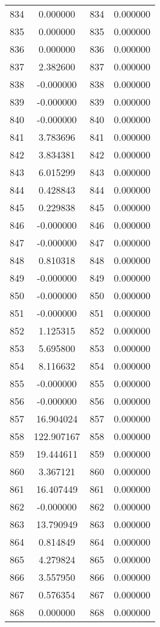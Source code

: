 \documentclass[12pt]{article}
\begin{document}
\begin{longtable}{@{}cccc@{}}
834 & 0.000000 & 834 & 0.000000 \\
835 & 0.000000 & 835 & 0.000000 \\
836 & 0.000000 & 836 & 0.000000 \\
837 & 2.382600 & 837 & 0.000000 \\
838 & -0.000000 & 838 & 0.000000 \\
839 & -0.000000 & 839 & 0.000000 \\
840 & -0.000000 & 840 & 0.000000 \\
841 & 3.783696 & 841 & 0.000000 \\
842 & 3.834381 & 842 & 0.000000 \\
843 & 6.015299 & 843 & 0.000000 \\
844 & 0.428843 & 844 & 0.000000 \\
845 & 0.229838 & 845 & 0.000000 \\
846 & -0.000000 & 846 & 0.000000 \\
847 & -0.000000 & 847 & 0.000000 \\
848 & 0.810318 & 848 & 0.000000 \\
849 & -0.000000 & 849 & 0.000000 \\
850 & -0.000000 & 850 & 0.000000 \\
851 & -0.000000 & 851 & 0.000000 \\
852 & 1.125315 & 852 & 0.000000 \\
853 & 5.695800 & 853 & 0.000000 \\
854 & 8.116632 & 854 & 0.000000 \\
855 & -0.000000 & 855 & 0.000000 \\
856 & -0.000000 & 856 & 0.000000 \\
857 & 16.904024 & 857 & 0.000000 \\
858 & 122.907167 & 858 & 0.000000 \\
859 & 19.444611 & 859 & 0.000000 \\
860 & 3.367121 & 860 & 0.000000 \\
861 & 16.407449 & 861 & 0.000000 \\
862 & -0.000000 & 862 & 0.000000 \\
863 & 13.790949 & 863 & 0.000000 \\
864 & 0.814849 & 864 & 0.000000 \\
865 & 4.279824 & 865 & 0.000000 \\
866 & 3.557950 & 866 & 0.000000 \\
867 & 0.576354 & 867 & 0.000000 \\
868 & 0.000000 & 868 & 0.000000 \\

\end{longtable}
\end{document}
